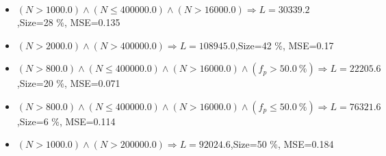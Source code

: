 \documentclass[numbered]{CSL}
\begin{document}
\begin{itemize}
\item $(N > 1000.0) \land (N \leq 400000.0) \land (N > 16000.0) \Rightarrow L = 30339.2$,\hfill Size=28 \%, MSE=0.135
\item $(N > 2000.0) \land (N > 400000.0) \Rightarrow L = 108945.0$,\hfill Size=42 \%, MSE=0.17
\item $(N > 800.0) \land (N \leq 400000.0) \land (N > 16000.0) \land (f_p > 50.0~\%) \Rightarrow L = 22205.6$,\hfill Size=20 \%, MSE=0.071
\item $(N > 800.0) \land (N \leq 400000.0) \land (N > 16000.0) \land (f_p \leq 50.0~\%) \Rightarrow L = 76321.6$,\hfill Size=6 \%, MSE=0.114
\item $(N > 1000.0) \land (N > 200000.0) \Rightarrow L = 92024.6$,\hfill Size=50 \%, MSE=0.184
\end{itemize}
\end{document}

